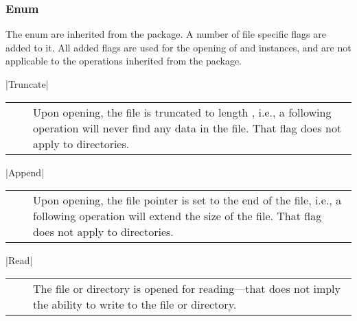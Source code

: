 %   


 \subsubsection*{Enum }

  The enum  are inherited from the
   package.  A number of file specific flags are
  added to it.  All added flags are used for the opening of
   and  instances, and are not applicable
  to the operations inherited from the  package.
  
    |Truncate|\\[0.3mm]
    \begin{tabular}{cp{110mm}}
      ~~ & Upon opening, the file is truncated to length 
           \T{0}, i.e., a following \T{read()} operation will 
           never find any data in the file.  That flag does not 
           apply to directories.
    \end{tabular}

    |Append|\\[0.3mm]
    \begin{tabular}{cp{110mm}}
      ~~ & Upon opening, the file pointer is set to the 
           end of the file, i.e., a following \T{write()} 
           operation will extend the size of the file.  That 
           flag does not apply to directories.
    \end{tabular}

    |Read|\\[0.3mm]
    \begin{tabular}{cp{110mm}}
      ~~ & The file or directory is opened for reading---that does not imply the ability to write to the 
           file or directory.
    \end{tabular}

